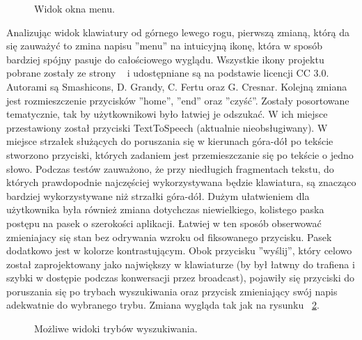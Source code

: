 \documentclass[twoside,a4paper]{book}
\begin{document}
\begin{figure}
		\centering
		\caption{Widok okna menu.}
		\label{fig:menu}
		\end{figure}
 Analizując widok klawiatury od górnego lewego rogu, pierwszą zmianą, którą da się zauważyć to zmina napisu ''menu'' na intuicyjną ikonę, która w sposób bardziej spójny pasuje do całościowego wyglądu. Wszystkie ikony projektu pobrane zostały ze strony ~\cite{resource} i udostępniane są na podstawie licencji CC 3.0. Autorami są Smashicons, D. Grandy, C. Fertu oraz G. Cresnar. Kolejną zmiana jest rozmieszczenie przycisków ''home'', ''end'' oraz ''czyść''. Zostały posortowane tematycznie, tak by użytkownikowi było łatwiej je odszukać. W ich miejsce przestawiony został przyciski TextToSpeech (aktualnie nieobsługiwany). W miejsce strzałek służących do poruszania się w kierunach góra-dół po tekście stworzono przyciski, których zadaniem jest przemieszczanie się po tekście o jedno słowo. Podczas testów zauważono, że przy niedługich fragmentach tekstu, do których prawdopodnie najczęściej wykorzystywana będzie klawiatura, są znacząco bardziej wykorzystywane niż strzałki góra-dół. 
Dużym ułatwieniem dla użytkownika była również zmiana dotychczas niewielkiego, kolistego paska postępu na pasek o szerokości aplikacji. Łatwiej w ten sposób obserwować zmieniajacy się stan bez odrywania wzroku od fiksowanego przycisku. Pasek dodatkowo jest w kolorze kontrastującym. 
Obok przycisku ''wyślij'', który celowo został zaprojektowany jako największy w klawiaturze (by był łatwny do trafiena i szybki w dostępie podczas konwersacji przez broadcast), pojawiły się przyciski do poruszania się po trybach wyszukiwania oraz przycisk zmieniający swój napis adekwatnie do wybranego trybu. Zmiana wygląda tak jak na rysunku ~\ref{fig:searchType}.
\begin{figure}
		\centering
		\caption{Możliwe widoki trybów wyszukiwania.}
		\label{fig:searchType}
		\end{figure}
\end{document}
